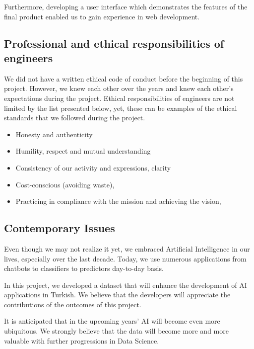 \documentclass{mefsdp}
\begin{document}
	Furthermore, developing a user interface which demonstrates the features of the final product enabled us to gain experience in web development.  
	
	\subsection{Professional and ethical responsibilities of engineers}
	
	We did not have a written ethical code of conduct before the beginning of this project. However, we knew each other over the years and knew each other's expectations during the project.
	Ethical responsibilities of engineers are not limited by the list presented below, yet, these can be examples of the ethical standards that we followed during the project.
	
	\begin{itemize}
		\item	Honesty and authenticity
		\item	Humility, respect and mutual understanding
		\item	Consistency of our activity and expressions, clarity
		\item	Cost-conscious (avoiding waste),
		\item	Practicing in compliance with the mission and achieving the vision,
	\end{itemize}
	
	
	\subsection{Contemporary Issues}
	
	Even though we may not realize it yet, we embraced Artificial Intelligence in our lives, especially over the last decade. Today, we use numerous applications from chatbots to classifiers to predictors day-to-day basis. \newline \par
	
	In this project, we developed a dataset that will enhance the development of AI applications in Turkish. We believe that the developers will appreciate the contributions of the outcomes of this project. \newline \par
	
	It is anticipated that in the upcoming years' AI will become even more ubiquitous. We strongly believe that the data will become more and more valuable with further progressions in Data Science. \newline \par
	
\end{document}
